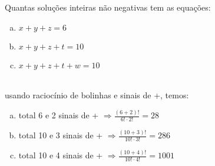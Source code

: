 \begin{ex}
 	Quantas soluções inteiras não negativas tem as equações:
 	 \begin{enumerate}[(a)]
    \item $x+y+z=6$
    \item $x+y+z+t=10$
    \item $x+y+z+t+w=10$
    \end{enumerate}
 	  \begin{sol}
 	    \phantom{A} \\
 	    usando raciocínio de bolinhas e sinais de +, temos:
 	      \begin{enumerate} [(a)]
 	          \item total 6 e 2 sinais de + $\Longrightarrow \frac{(6+2)!}{6!\cdot2!}= 28$
 	          \item total 10 e 3 sinais de + $\Longrightarrow \frac{(10+3)!}{10!\cdot3!}=286$
 	          \item total 10 e 4 sinais de +
 	          $\Longrightarrow \frac{(10+4)!}{10!\cdot4!}=1001$
 	      \end{enumerate}
 	 \end{sol}
\end{ex}